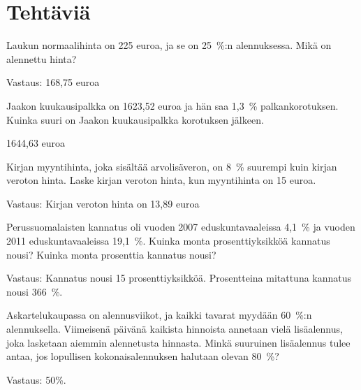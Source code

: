 \section*{Tehtäviä}

\begin{tehtava}
    Laukun normaalihinta on 225 euroa, ja se on 25~\%:n alennuksessa.
    Mikä on alennettu hinta?
    \begin{vastaus}
    Vastaus: 168,75 euroa
    \end{vastaus}
\end{tehtava}

\begin{tehtava}
    Jaakon kuukausipalkka on 1623,52 euroa ja hän saa 1,3\, \% palkankorotuksen. Kuinka suuri on Jaakon kuukausipalkka korotuksen jälkeen.
    \begin{vastaus}
    1644,63 euroa
    \end{vastaus}
\end{tehtava}

\begin{tehtava}
    Kirjan myyntihinta, joka sisältää arvolisäveron, on 8~\% suurempi kuin kirjan veroton hinta. Laske kirjan veroton hinta, kun myyntihinta on 15 euroa.
    \begin{vastaus}
        Vastaus: Kirjan veroton hinta on 13,89 euroa
    \end{vastaus}
\end{tehtava}

\begin{tehtava}
    Perussuomalaisten kannatus oli vuoden 2007 eduskuntavaaleissa 4,1~\% ja vuoden 2011 eduskuntavaaleissa 19,1~\%. Kuinka monta prosenttiyksikköä kannatus nousi? Kuinka monta prosenttia kannatus nousi?
    \begin{vastaus}
    Vastaus: Kannatus nousi 15 prosenttiyksikköä. Prosentteina mitattuna kannatus nousi 366~\%.
    \end{vastaus}
\end{tehtava}

\begin{tehtava}
    Askartelukaupassa on alennusviikot, ja kaikki tavarat myydään 60~\%:n alennuksella. Viimeisenä päivänä kaikista hinnoista annetaan vielä lisäalennus, joka lasketaan aiemmin alennetusta hinnasta. Minkä suuruinen lisäalennus tulee antaa, jos lopullisen kokonaisalennuksen halutaan olevan 80~\%?
    \begin{vastaus}
        Vastaus: 50\%.
    \end{vastaus}
\end{tehtava}

